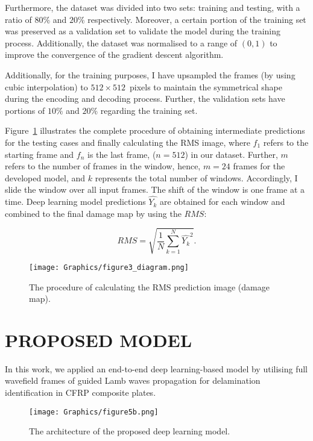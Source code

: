 \documentclass{IOS-Book-Article}
\begin{document}
Furthermore, the dataset was divided into two sets: training and testing, with a ratio of \(80\%\) and \(20\% \) respectively.
Moreover, a certain portion of the training set was preserved as a validation set to validate the model during the training process.
Additionally, the dataset was normalised to a range of \((0, 1)\) to improve the convergence of the gradient descent algorithm.

Additionally, for the training purposes, I have upsampled the frames (by using cubic interpolation) to \(512\times512\)~pixels to maintain the symmetrical shape during the encoding and decoding process.
Further, the validation sets have portions of \(10\%\) and \(20\%\) regarding the training set.

Figure~\ref{fig:Diagram_exp_predictions} illustrates the complete procedure of obtaining intermediate predictions for the testing cases and finally calculating the RMS image, where \(f_{1}\) refers to the starting frame and \(f_{n}\) is the last frame, (\(n=512\)) in our dataset.
Further, \(m\) refers to the number of frames in the window, hence, \(m=24\) frames for the developed model, and \(k\) represents the total number of windows.
Accordingly, I slide the window over all input frames.
The shift of the window is one frame at a time.
Deep learning model predictions \(\hat{Y_k}\) are obtained for each window and combined to the final damage map by using the $RMS$:

\begin{equation}
	RMS = \sqrt{\frac{1}{N}\sum_{k=1}^{N}\hat{Y_k}^2}.	
	\label{RMS}
\end{equation}
\begin{figure}[!h]
	\centering
	\texttt{[image: Graphics/figure3\_diagram.png]}
	\caption{The procedure of calculating the RMS prediction image (damage map).}
	\label{fig:Diagram_exp_predictions}
\end{figure}
\section{PROPOSED MODEL}\label{sec:section4}
In this work, we applied an end-to-end deep learning-based model by utilising 
full wavefield frames of guided Lamb waves propagation for delamination 
identification in CFRP composite plates.
\begin{figure} [h!]
	\begin{center}
		\texttt{[image: Graphics/figure5b.png]}
	\end{center}
	\caption{The architecture of the proposed deep learning model.} 
	\label{fig:AE_convlstm}
\end{figure}
\end{document}
